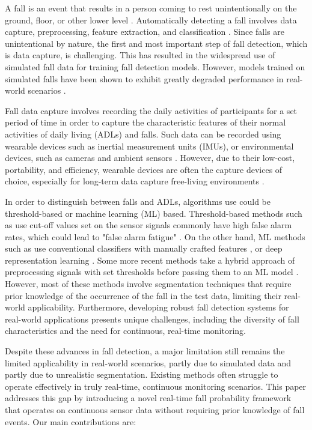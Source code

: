 \documentclass[runningheads]{llncs}
\begin{document}
A fall is an event that results in a person coming to rest unintentionally on the ground, floor, or other lower level \cite{step_safely_2021}. Automatically detecting a fall involves data capture, preprocessing, feature extraction, and classification \cite{liu2023review}. Since falls are unintentional by nature, the first and most important step of fall detection, which is data capture, is challenging. This has resulted in the widespread use of simulated fall data for training fall detection models. However, models trained on simulated falls have been shown to exhibit greatly degraded performance in real-world scenarios \cite{aderinola2024accurate}.

Fall data capture involves recording the daily activities of participants for a set period of time in order to capture the characteristic features of their normal activities of daily living (ADLs) and falls. Such data can be recorded using wearable devices such as inertial measurement units (IMUs), or environmental devices, such as cameras and ambient sensors \cite{gaya2024deep}. However, due to their low-cost, portability, and efficiency, wearable devices are often the capture devices of choice, especially for long-term data capture free-living environments \cite{mohan2024artificial}.

In order to distinguish between falls and ADLs, algorithms use could be threshold-based or machine learning (ML) based. Threshold-based methods such as \cite{de2021wearable} use cut-off values set on the sensor signals commonly have high false alarm rates, which could lead to "false alarm fatigue" \cite{mosquera2020automated}. On the other hand, ML methods such as  use conventional classifiers with manually crafted features \cite{son2022machine}, or deep representation learning \cite{liu2023deep}. Some more recent methods take a hybrid approach of preprocessing signals with set thresholds before passing them to an ML model \cite{fernandez2024edge}. However, most of these methods involve segmentation techniques that require prior knowledge of the occurrence of the fall in the test data, limiting their real-world applicability. Furthermore, developing robust fall detection systems for real-world applications presents unique challenges, including the diversity of fall characteristics and the need for continuous, real-time monitoring.

Despite these advances in fall detection, a major limitation still remains the limited applicability in real-world scenarios, partly due to simulated data and partly due to unrealistic segmentation. Existing methods often struggle to operate effectively in truly real-time, continuous monitoring scenarios. This paper addresses this gap by introducing a novel real-time fall probability framework that operates on continuous sensor data without requiring prior knowledge of fall events. Our main contributions are:
\end{document}
